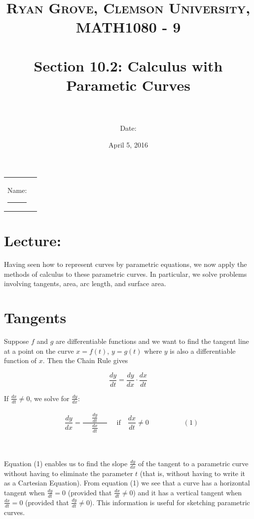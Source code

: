 \documentclass[paper=a4, fontsize=11pt]{scrartcl} %
\title{	
\normalfont \normalsize 
\textsc{Ryan Grove, Clemson University, MATH1080 - 9} \\ [25pt] %
\horrule{0.5pt} \\[0.4cm] %
\huge Section 10.2: Calculus with Parametic Curves\\ %
\horrule{2pt} \\[0.5cm] %
}
\author{Date:} %
\date{\normalsize April 5, 2016} %
\numberwithin{equation}{section} %
\numberwithin{figure}{section} %
\numberwithin{table}{section} %
\newcommand{\ds}{\displaystyle}
\begin{document}
\maketitle %

\begin{flushleft}
\begin{tabular}{l l}
Name: \rule{3.2in}{.01cm}  & {}%
\end{tabular}
\end{flushleft}


\section*{\textbf{Lecture:}}
\indent

Having seen how to represent curves by parametric equations, we now apply the methods of calculus to these parametric curves. In particular, we solve problems involving tangents, area, arc length, and surface area.\\

\section*{Tangents}
Suppose $f$ and $g$ are differentiable functions and we want to find the tangent line at a point on the curve $x=f(t)$, $y=g(t)$ where $y$ is also a differentiable function of $x$. Then the Chain Rule gives

\[\ds\frac{dy}{dt} = \ds\frac{dy}{dx}\cdot \ds\frac{dx}{dt}\]
\indent

If \text{ }$\ds\frac{dx}{dt}\neq 0$, we solve for $\ds\frac{dy}{dx}$:\\
\indent\\

\[\boxed{\quad \ds\frac{dy}{dx} = \ds\frac{\text{ }\text{ }\ds\frac{dy}{dt}\text{ }\text{ }}{\ds\frac{dx}{dt}} \quad \text{ if } \text{ } \ds\frac{dx}{dt}\neq 0 \quad} \quad \quad \quad \quad (1)\]
\indent\\
\indent\\
\indent

Equation (1) enables us to find the slope $\ds\frac{dy}{dx}$ of the tangent to a parametric curve without having to eliminate the parameter $t$ (that is, without having to write it as a Cartesian Equation). From equation (1) we see that a curve has a horizontal tangent when $\ds\frac{dy}{dt}=0$ (provided that $\ds\frac{dx}{dt}\neq 0$) and it has a vertical tangent when $\ds\frac{dx}{dt}=0$ (provided that $\ds\frac{dy}{dt}\neq 0$). This information is useful for sketching parametric curves.\\
\indent\\
\indent
\end{document}
